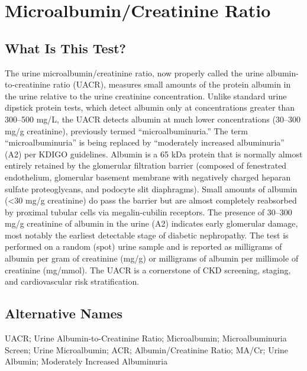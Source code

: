 \chapter{Microalbumin/Creatinine Ratio}

\section*{What Is This Test?}
The urine microalbumin/creatinine ratio, now properly called the urine albumin-to-creatinine ratio (UACR), measures small amounts of the protein albumin in the urine relative to the urine creatinine concentration. Unlike standard urine dipstick protein tests, which detect albumin only at concentrations greater than 300--500 mg/L, the UACR detects albumin at much lower concentrations (30--300 mg/g creatinine), previously termed ``microalbuminuria.'' The term ``microalbuminuria'' is being replaced by ``moderately increased albuminuria'' (A2) per KDIGO guidelines. Albumin is a 65 kDa protein that is normally almost entirely retained by the glomerular filtration barrier (composed of fenestrated endothelium, glomerular basement membrane with negatively charged heparan sulfate proteoglycans, and podocyte slit diaphragms). Small amounts of albumin (<30 mg/g creatinine) do pass the barrier but are almost completely reabsorbed by proximal tubular cells via megalin-cubilin receptors. The presence of 30--300 mg/g creatinine of albumin in the urine (A2) indicates early glomerular damage, most notably the earliest detectable stage of diabetic nephropathy. The test is performed on a random (spot) urine sample and is reported as milligrams of albumin per gram of creatinine (mg/g) or milligrams of albumin per millimole of creatinine (mg/mmol). The UACR is a cornerstone of CKD screening, staging, and cardiovascular risk stratification.

\section*{Alternative Names}
UACR; Urine Albumin-to-Creatinine Ratio; Microalbumin; Microalbuminuria Screen; Urine Microalbumin; ACR; Albumin/Creatinine Ratio; MA/Cr; Urine Albumin; Moderately Increased Albuminuria

